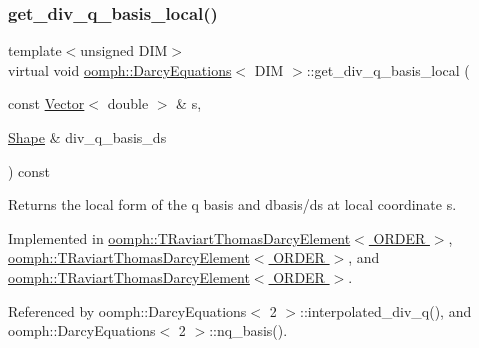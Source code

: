 \mbox{\label{classoomph_1_1DarcyEquations_ad1d3676060924184befea1157a0735cd}} 
\subsubsection{\texorpdfstring{get\+\_\+div\+\_\+q\+\_\+basis\+\_\+local()}{get\_div\_q\_basis\_local()}}
{\footnotesize\ttfamily template$<$unsigned D\+IM$>$ \\
virtual void \hyperlink{classoomph_1_1DarcyEquations}{oomph\+::\+Darcy\+Equations}$<$ D\+IM $>$\+::get\+\_\+div\+\_\+q\+\_\+basis\+\_\+local (\begin{DoxyParamCaption}\item[{const \hyperlink{classoomph_1_1Vector}{Vector}$<$ double $>$ \&}]{s,  }\item[{\hyperlink{classoomph_1_1Shape}{Shape} \&}]{div\+\_\+q\+\_\+basis\+\_\+ds }\end{DoxyParamCaption}) const\hspace{0.3cm}{\ttfamily [pure virtual]}}



Returns the local form of the q basis and dbasis/ds at local coordinate s. 



Implemented in \hyperlink{classoomph_1_1TRaviartThomasDarcyElement_a054174561fc65ac0406c6e18fb2d0daa}{oomph\+::\+T\+Raviart\+Thomas\+Darcy\+Element$<$ O\+R\+D\+E\+R $>$}, \hyperlink{classoomph_1_1TRaviartThomasDarcyElement_a6cbe24cce6930993cba8200964816919}{oomph\+::\+T\+Raviart\+Thomas\+Darcy\+Element$<$ O\+R\+D\+E\+R $>$}, and \hyperlink{classoomph_1_1TRaviartThomasDarcyElement_a1fd04fa65b0925c6d23b37c1e04a80cb}{oomph\+::\+T\+Raviart\+Thomas\+Darcy\+Element$<$ O\+R\+D\+E\+R $>$}.



Referenced by oomph\+::\+Darcy\+Equations$<$ 2 $>$\+::interpolated\+\_\+div\+\_\+q(), and oomph\+::\+Darcy\+Equations$<$ 2 $>$\+::nq\+\_\+basis().

\mbox{\label{classoomph_1_1DarcyEquations_ab413b560166194e4a9d1b7de4742c5c0}} 
